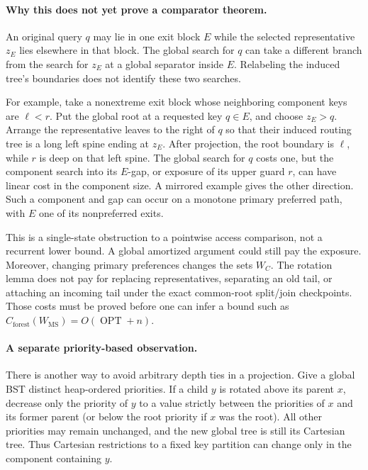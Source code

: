 \documentclass[11pt]{article}
\newcommand{\OPT}{\operatorname{OPT}}
\begin{document}
\paragraph{Why this does not yet prove a comparator theorem.}
An original query $q$ may lie in one exit block $E$ while the selected
representative $z_E$ lies elsewhere in that block. The global search
for $q$ can take a different branch from the search for $z_E$ at a
global separator inside $E$. Relabeling the induced tree's boundaries
does not identify these two searches.

For example, take a nonextreme exit block whose neighboring component
keys are $\ell<r$. Put the global root at a requested key $q\in E$,
and choose $z_E>q$. Arrange the representative leaves to the right of
$q$ so that their induced routing tree is a long left spine ending at
$z_E$. After projection, the root boundary is $\ell$, while $r$ is
deep on that left spine. The global search for $q$ costs one, but the
component search into its $E$-gap, or exposure of its upper guard $r$,
can have linear cost in the component size. A mirrored example gives
the other direction. Such a component and gap can occur on a monotone
primary preferred path, with $E$ one of its nonpreferred exits.

This is a single-state obstruction to a pointwise access comparison,
not a recurrent lower bound. A global amortized argument could still
pay the exposure. Moreover, changing primary preferences changes the
sets $W_C$. The rotation lemma does not pay for replacing representatives,
separating an old tail, or attaching an incoming tail under the exact
common-root split/join checkpoints. Those costs must be proved before
one can infer a bound such as
$C_{\mathrm{forest}}(W_{\mathrm{MS}})=O(\OPT+n)$.

\paragraph{A separate priority-based observation.}
There is another way to avoid arbitrary depth ties in a projection.
Give a global BST distinct heap-ordered priorities. If a child $y$ is
rotated above its parent $x$, decrease only the priority of $y$ to a
value strictly between the priorities of $x$ and its former parent
(or below the root priority if $x$ was the root). All other priorities
may remain unchanged, and the new global tree is still its Cartesian
tree. Thus Cartesian restrictions to a fixed key partition can change
only in the component containing $y$.
\end{document}
